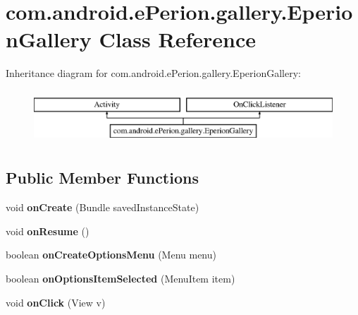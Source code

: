 \section{com.\-android.\-e\-Perion.\-gallery.\-Eperion\-Gallery Class Reference}
\label{classcom_1_1android_1_1e_perion_1_1gallery_1_1_eperion_gallery}
Inheritance diagram for com.\-android.\-e\-Perion.\-gallery.\-Eperion\-Gallery\-:\begin{figure}[H]
\begin{center}
\leavevmode
\includegraphics[height=2.000000cm]{classcom_1_1android_1_1e_perion_1_1gallery_1_1_eperion_gallery}
\end{center}
\end{figure}
\subsection*{Public Member Functions}
\begin{DoxyCompactItemize}
\item 
void {\bfseries on\-Create} (Bundle saved\-Instance\-State)\label{classcom_1_1android_1_1e_perion_1_1gallery_1_1_eperion_gallery_adc3a3cb26c2f50e1b549b496b62e034a}

\item 
void {\bfseries on\-Resume} ()\label{classcom_1_1android_1_1e_perion_1_1gallery_1_1_eperion_gallery_a60e71781e6db2a14d2954fe88b389556}

\item 
boolean {\bfseries on\-Create\-Options\-Menu} (Menu menu)\label{classcom_1_1android_1_1e_perion_1_1gallery_1_1_eperion_gallery_a0e2daf3cc31ff039939c31c26f69eb24}

\item 
boolean {\bfseries on\-Options\-Item\-Selected} (Menu\-Item item)\label{classcom_1_1android_1_1e_perion_1_1gallery_1_1_eperion_gallery_a4281699fa77fb30b05a6a3800ff52866}

\item 
void {\bfseries on\-Click} (View v)\label{classcom_1_1android_1_1e_perion_1_1gallery_1_1_eperion_gallery_af74253723402b80e9b939db596cd5480}

\end{DoxyCompactItemize}
